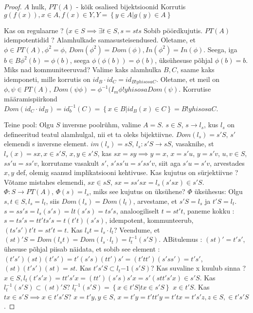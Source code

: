 \documentclass[12pt]{report}
\numberwithin{equation}{section}
\theoremstyle{definition}
\theoremstyle{plain}
\begin{document}
\begin{proof}



$A$ hulk, $PT(A)$ - kõik osalised bijektsioonid
Korrutis $g(f(x)),  x \in A, f(x) \in Y, Y = \left\lbrace y \in A| g(y) \in A \right\rbrace$

Kas on regulaarne ? ($x \in S \implies \exists t \in S, s = sts$ Sobib pöördkujutis. $PT(A)$ idempotentidid ? Alamhulkade samasusteisendused. Oletame, et $\phi \in PT(A), \phi^2 = \phi$, $Dom(\phi^2) = Dom(\phi), In(\phi^2) = In(\phi)$. Seega, iga $b \in B \phi^2(b) = \phi(b)$, seega $\phi(\phi(b)) = \phi(b)$, \"uks\"uhesuse põhjal $\phi(b) = b$. Miks nad kommuniteeruvad? Valime kaks alamhulka $B,C$, saame kaks idemponeti, mille korrutis on $id_B \cdot id_C = id_{B !yhisosa C}$. Oletame, et meil on $\phi,\psi \in PT(A)$, $Dom(\psi \phi) = \phi^{-1}(I_m \phi !yhisosa Dom (\psi)$. Korrutise määramispiirkond $Dom(id_C \cdot id_B) = id_b ^{-1} ( C) = \left\lbrace x \in B | id_B(x) \in C \right\rbrace = B !yhisosa C$.

Teine pool:
Olgu $S$  inversne poolr\"uhm, valime $A = S$. $s \in S$, $s \to l_s$, kus $l_s$ on defineeritud teatul alamhulgal, nii et ta oleks bijektiivne. $Dom(l_s) = s'S$, $s'$ elemendi s inversne element. $im(l_s) = sS$, $l_s : s'S \to sS$, vasaknihe, st $l_s(x) = sx, x \in s'S$, $x,y \in s'S$, kas $sx = sy \implies y = x$, $x = s'u$, $y = s'v$, $u,v \in S$, $ss'u = ss'v$, korrutame vasakult $s'$, $s'ss'u = s'ss'v$, siit aga $s'u = s'v$, arvestades $x,y$ def, olemig saanud implikatsiooni kehtivuse. Kas kujutus on s\"urjektiivne ? Võtame mistahes elemendi, $sx \in sS$, $sx = ss'sx = l_s(s'sx) \in s'S$.
$\Phi: S \to PT(A)$, $\Phi(s) = l_s$, miks see kujutus on \"uks\"uhene? $\Phi$ \"uks\"uhesus: Olgu $s,t \in S, l_s = l_t$, siis $Dom(l_s) = Dom(l_t)$, arvestame, et $s'S = l_s $ ja $t'S = l_t$. $s = ss's = l_s(s's) = lt(s's) = ts's$, analoogiliselt $t = st't$, paneme kokku : $s = ts's = tt'ts's = t(t't)(s's)$, idempotent, kommunteerub, $ (ts's')t't = st't = t$. Kas $l_st = l_s \cdot l_t$?  Veendume, et $(st)'S =Dom(l_st) = Dom(l_s \cdot l_t ) = l_t^{-1}(s'S)$. ABitulemus : $(st)' = t's'$, \"uhesuse põhjal piisab näidata, et sobib see element : $(t's')(st)(t's') = t'(s's)(tt')s' = (t'tt')(s'ss') = t's'$, $(st)(t's')(st) = st$.
Kas $t's'S \subset l_t{-1}(s'S)$? Kas suvaline x kuulub sinna ? $x \in S, l_t(t's'x) = tt's'x = (tt')(s's)s'x = s'(stt's'x) \in s'S$. Kas $l_t^{-1}(s'S) \subset (st)'S$? $l_t^{-1}(s'S) = \left\lbrace x \in t'S | tx \in s'S \right\rbrace$ $x \in t'S$. Kas $ tx \in s'S \implies x \in t's'S$? $x = t'y, y \in S$, $x = t'y = t'tt'y = t'tx = t's'z, z \in S, \in t's'S$. 

\end{proof}
\end{document}
